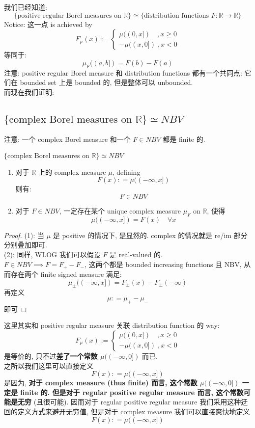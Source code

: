 \documentclass[lang=cn,11pt]{elegantbook}
\begin{document}
我们已经知道:
$$\{\text{positive regular Borel measures on }\mathbb{R}\} \simeq \{\text{distribution functions }F:\mathbb{R}\to\mathbb{R} \}$$
Notice: 这一点 is achieved by 
$$
F_\mu(x ) := \begin{cases}
    \mu((0,x]) \quad  , x \geq 0 \\
     -\mu((x,0]) \; , x < 0
\end{cases}
$$
等同于: $$\mu_F ((a,b]) = F(b) - F(a)$$注意: positive regular Borel measure 和 distribution functions 都有一个共同点: 它们在 bounded set 上是 bounded 的, 但是整体可以 unbounded.\\

而现在我们证明:
\subsection{$\{\text{complex Borel measures on }\mathbb{R}\} \simeq NBV$}
注意: 一个 complex Borel measure 和一个 $F \in NBV$ 都是 finite 的.

\begin{theorem}{$\{\text{complex Borel measures on }\mathbb{R}\} \simeq NBV$}
\begin{enumerate}
    \item 对于 $\mathbb{R}$ 上的 complex measure $\mu$,  defining \[F(x) : = \mu((-\infty,x])\] 则有: \[F \in NBV\]
    \item 对于 $F \in NBV$, 一定存在某个 unique complex measure $\mu_F$ on $\mathbb{R}$, 使得 \[ \mu((-\infty,x]) = F(x) \quad \forall x \]
\end{enumerate}
\end{theorem}
\begin{proof}
    (1): 当 $\mu$ 是 positive 的情况下, 是显然的. complex 的情况就是 re/im 部分分别叠加即可.\\
    (2): 同样, WLOG 我们可以假设 $F$ 是 real-valued 的.\\
    $F\in NBV\implies F = F_+ - F_-$, 这两个都是 bounded increasing functions 且 NBV, 从而存在两个 finite signed measure 满足: \[  \mu_{\pm}((-\infty,x])  = F_{\pm}(x) - F_{\pm}(-\infty)  \] 再定义 \[\mu : = \mu_+ - \mu_-\] 即可
\end{proof}
\begin{remark}
    这里其实和 positive regular measure 关联 distribution function 的 way:
$$
F_\mu(x ) := \begin{cases}
    \mu((0,x]) \quad  , x \geq 0 \\
     -\mu((x,0]) \; , x < 0
\end{cases}
$$
是等价的, 只不过\textbf{差了一个常数 $\mu((-\infty,0])$} 而已. \\
之所以我们这里可以直接定义 \[F(x) : = \mu((-\infty,x])\]是因为, \textbf{对于 complex measure (thus finite) 而言, 这个常数 $\mu((-\infty,0])$ 一定是 finite 的. 但是对于 regular positive regular measure 而言, 这个常数可能是无穷} (且很可能). 因而对于 regular positive regular measure 我们采用这种迂回的定义方式来避开无穷值, 但是对于 complex measure 我们可以直接爽快地定义\[F(x) : = \mu((-\infty,x])\]
\end{remark}
\end{document}
